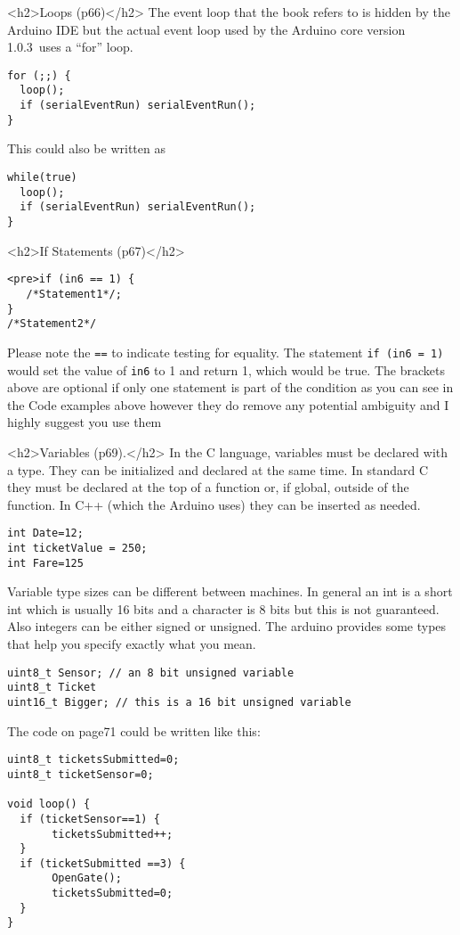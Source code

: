 \documentclass{article}
\begin{document}
{<h2>Loops (p66)</h2>
The event loop that the book refers to is hidden by the Arduino IDE but the actual event loop used by the Arduino core version 1.0.3 uses a ``for'' loop.
\begin{verbatim}
for (;;) {
  loop();
  if (serialEventRun) serialEventRun();
}
\end{verbatim}

This could also be written as
\begin{verbatim}
while(true)
  loop();
  if (serialEventRun) serialEventRun();
}
\end{verbatim}

<h2>If Statements (p67)</h2>
\begin{verbatim}
<pre>if (in6 == 1) {
   /*Statement1*/;
}
/*Statement2*/
\end{verbatim}

Please note the \verb|==| to indicate testing for equality. The statement
\verb|if (in6 = 1)|
would set the value of \verb|in6| to 1 and return 1, which would be true.
The brackets above are optional if only one statement is part of the condition as you can see in the Code examples above however they do remove any potential ambiguity and I highly suggest you use them

<h2>Variables (p69).</h2>
In the C language, variables must be declared with a type. They can be initialized and declared at the same time. In standard C they must be declared at the top of a function or, if global, outside of the function. In C++ (which the Arduino uses) they can be inserted as needed.
\begin{verbatim}
int Date=12;
int ticketValue = 250;
int Fare=125
\end{verbatim}

Variable type sizes can be different between machines. In general an int is a short int which is usually 16 bits and a character is 8 bits but this is not guaranteed. Also integers can be either signed or unsigned. The arduino provides some types that help you specify exactly what you mean.

\begin{verbatim}
uint8_t Sensor; // an 8 bit unsigned variable
uint8_t Ticket
uint16_t Bigger; // this is a 16 bit unsigned variable
\end{verbatim}

The code on page71 could be written like this:
\begin{verbatim}
uint8_t ticketsSubmitted=0;
uint8_t ticketSensor=0;

void loop() {
  if (ticketSensor==1) {
       ticketsSubmitted++;
  }
  if (ticketSubmitted ==3) {
       OpenGate();
       ticketsSubmitted=0;
  }
}
\end{verbatim}


}
\end{document}
